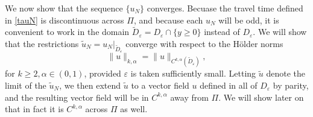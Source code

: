 \documentclass[11pt]{article}
\newcommand{\Red}{}
\renewcommand{\Red}[1]{{\color{red} #1}}
\theoremstyle{plain}
\numberwithin{equation}{section}
\theoremstyle{remark}
\newcommand{\ve}{{\varepsilon}}
\newcommand{\pa}{\partial}
\begin{document}
%
%
%
%

We now show that the sequence $\{u_N\}$ converges.
Becuase the travel time defined in \eqref{tauN} is discontinuous
across $\Pi$, and because each $u_N$ will be
odd, it is convenient to work in the domain
$\widetilde{D}_\ve = D_\ve \cap \{y \geq 0\}$
instead of $D_\ve$. We will show that the restrictions $\widetilde{u}_N = u_N|_{\widetilde{D}_\ve}$
converge with respect to the H\"{o}lder norms
\begin{equation}
  \label{}
  \|u\|_{k, \alpha} = \|u\|_{C^{k, \alpha}(\widetilde{D}_\ve)},
\end{equation}
for $k \geq 2, \alpha \in (0, 1)$, provided $\ve$ is taken sufficiently small.
Letting $\widetilde{u}$ denote the limit of the $\widetilde{u}_N$, we then extend
$\widetilde{u}$ to a vector field $u$ defined in all of $D_\ve$ by parity,
and the resulting vector field will be in $C^{k, \alpha}$ away from
$\Pi$. We will show later on that in fact it is $C^{k,\alpha}$ across
$\Pi$ as well.
\end{document}
